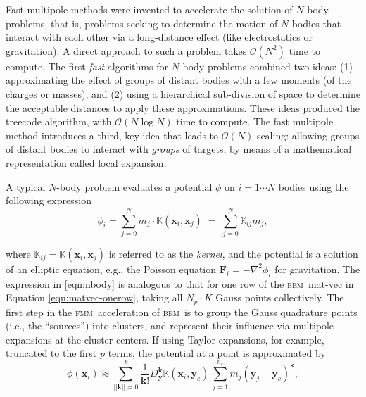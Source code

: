 \documentclass[final,leqno,]{siamltex1213}
\newcommand{\K}{\mathbb{K}}
\newcommand{\bem}{\textsc{bem}\xspace}
\newcommand{\fmm}{\textsc{fmm}\xspace}
\newcommand{\bigO}{\mathcal{O}}
\renewcommand{\O}[1]{\mathcal{O}(#1)}
\newcommand{\vect}[1]{\mathbf{#1}}
\begin{document}
Fast multipole methods were invented to accelerate the solution of $N$-body problems, that is, problems seeking to determine the motion of $N$ bodies that interact with each other via a long-distance effect (like electrostatics or gravitation). A direct approach to such a problem takes $\O{N^{2}}$ time to compute. The first \emph{fast} algorithms for $N$-body problems \cite{Appel1985,BarnesHut1986} combined two ideas: (1) approximating the effect of groups of distant bodies with a few moments (of the charges or masses), and (2) using a hierarchical sub-division of space to determine the acceptable distances to apply these approximations.
 These ideas produced the treecode algorithm, with $\bigO(N\log N)$ time to compute.
The fast multipole method \cite{GreengardRokhlin1987} introduces a third, key idea that leads to $\bigO(N)$ scaling: allowing groups of distant bodies to interact with \emph{groups} of targets, by means of a mathematical representation called local expansion.

A typical $N$-body problem evaluates a potential $\phi$ on $i=1\cdots N$ bodies
using the following expression
%
\begin{equation}\label{eqn:nbody}
	\phi_{i} = \sum_{j=0}^{N} m_{j}\cdot\K(\vect{x}_{i},\vect{x}_{j}) \; = \; \sum_{j=0}^{N}\K_{ij}m_{j},
\end{equation}

\noindent where $\K_{ij} = \K(\vect{x}_{i},\vect{x}_{j})$ is referred to as the \emph{kernel}, and the potential is a solution of an elliptic equation, e.g., the Poisson equation $\vect{F}_i = - \nabla^2 \phi_i$ for gravitation. The expression in \eqref{eqn:nbody} is analogous to that for one row of the \bem\ mat-vec in Equation \eqref{eqn:matvec-onerow}, taking all $N_p \cdot K$ Gauss points collectively.
The first step in the \fmm\ acceleration of \bem\ is to group the Gauss quadrature points (i.e., the ``sources'') into clusters, and represent their influence via multipole expansions at the cluster centers. If using Taylor expansions, for example, truncated to the first $p$ terms, the potential at a point is approximated by
%
\begin{equation}
	\phi(\vect{x}_i) \approx \sum_{||\vect{k}||=0}^{p}\frac{1}{\vect{k}!}D^{\vect{k}}_{\vect{y}} \K(\vect{x}_i,\vect{y}_c)\, \sum_{j=1}^{n_c} m_j (\vect{y}_j-\vect{y}_c)^{\vect{k}},
	\label{eqn:cartesian_multipole}
\end{equation}
\end{document}
